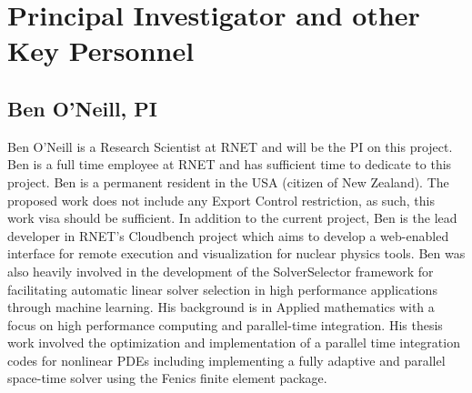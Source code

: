 \section{Principal Investigator and other Key Personnel}

\subsection{Ben O'Neill, PI}
Ben O'Neill is a Research Scientist at RNET and will be the PI on this project. Ben is a full time employee at
RNET and has sufficient time to dedicate to this project. Ben is a permanent resident in the USA (citizen of New Zealand). The proposed work does not include any Export Control restriction, as such, this work visa should be sufficient. In addition to the current project, Ben is the lead developer in RNET's
Cloudbench project which aims to develop a web-enabled interface for remote execution and visualization for nuclear physics tools. Ben was also heavily involved in the development of the SolverSelector framework for facilitating automatic linear solver selection in high performance applications through machine learning. His background is in Applied mathematics with a focus on high performance computing and parallel-time integration. His thesis work involved the optimization and implementation of a parallel time integration codes for nonlinear PDEs including implementing a fully adaptive and parallel space-time solver using the Fenics finite element package.

